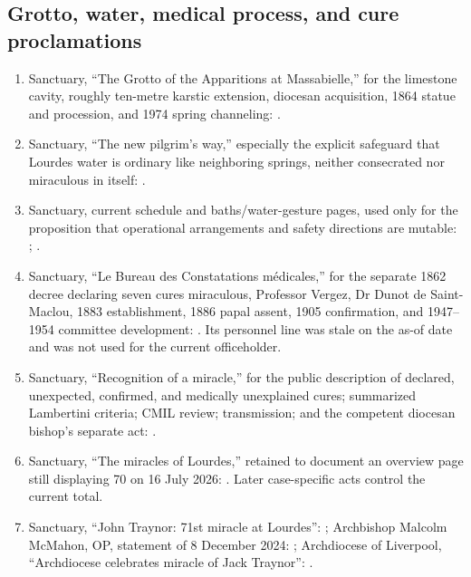 \subsection{Grotto, water, medical process, and cure proclamations}

\begin{enumerate}
  \item Sanctuary, “The Grotto of the Apparitions at Massabielle,” for the limestone cavity, roughly ten-metre karstic extension, diocesan acquisition, 1864 statue and procession, and 1974 spring channeling: .
  \item Sanctuary, “The new pilgrim's way,” especially the explicit safeguard that Lourdes water is ordinary like neighboring springs, neither consecrated nor miraculous in itself: .
  \item Sanctuary, current schedule and baths/water-gesture pages, used only for the proposition that operational arrangements and safety directions are mutable: ; .
  \item Sanctuary, “Le Bureau des Constatations médicales,” for the separate 1862 decree declaring seven cures miraculous, Professor Vergez, Dr Dunot de Saint-Maclou, 1883 establishment, 1886 papal assent, 1905 confirmation, and 1947--1954 committee development: . Its personnel line was stale on the as-of date and was not used for the current officeholder.
  \item Sanctuary, “Recognition of a miracle,” for the public description of declared, unexpected, confirmed, and medically unexplained cures; summarized Lambertini criteria; CMIL review; transmission; and the competent diocesan bishop's separate act: .
  \item Sanctuary, “The miracles of Lourdes,” retained to document an overview page still displaying 70 on 16 July 2026: . Later case-specific acts control the current total.
  \item Sanctuary, “John Traynor: 71st miracle at Lourdes”: ; Archbishop Malcolm McMahon, OP, statement of 8 December 2024: ; Archdiocese of Liverpool, “Archdiocese celebrates miracle of Jack Traynor”: .

\end{enumerate}
